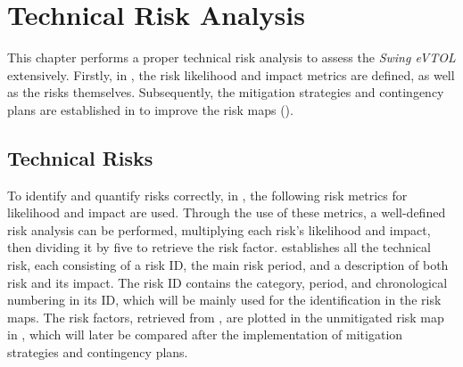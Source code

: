 \chapter{Technical Risk Analysis}
\label{ch:Technical_Risk_Assessment}
This chapter performs a proper technical risk analysis to assess the \textit{Swing eVTOL} extensively.
Firstly, in , the risk likelihood and impact metrics are defined, as well as the risks themselves.
Subsequently, the mitigation strategies and contingency plans are established in  to improve the risk maps
().

\section{Technical Risks}
\label{sec:tech_risks}
To identify and quantify risks correctly,
in , the following risk metrics for likelihood and impact are used.
Through the use of these metrics, a well-defined risk analysis can be performed,
multiplying each risk’s likelihood and impact, then dividing it by five to retrieve the risk factor.
 establishes all the technical risk, each consisting of a risk ID,
the main risk period, and a description of both risk and its impact.
The risk ID contains the category, period, and chronological numbering in its ID,
which will be mainly used for the identification in the risk maps.
The risk factors, retrieved from ,
are plotted in the unmitigated risk map in ,
which will later be compared after the implementation of mitigation strategies and contingency plans.

